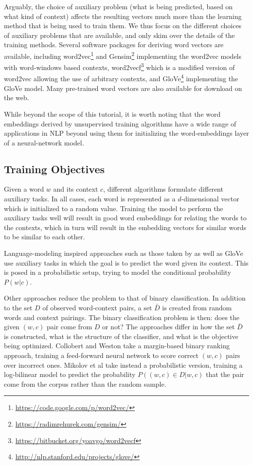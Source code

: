 \documentclass[jair,twoside,11pt,theapa]{article}
\renewcommand{\shortcite}[0]{\citeyear}
\begin{document}
{%
Arguably, the choice of auxiliary problem (what is being predicted, based
on what kind of context) affects the resulting vectors much more than the learning
method that is being used to train them.  We thus focus on the different
choices of auxiliary problems that are available, and only skim over the details
of the training methods.  Several software packages for deriving word vectors
are available, including word2vec\footnote{\url{https://code.google.com/p/word2vec/}} and Gensim\footnote{\url{https://radimrehurek.com/gensim/}}
implementing the word2vec models with word-windows based contexts,
word2vecf\footnote{\url{https://bitbucket.org/yoavgo/word2vecf}} which is a modified version of word2vec allowing
the use of arbitrary contexts, and GloVe\footnote{\url{http://nlp.stanford.edu/projects/glove/}} implementing the GloVe model.
Many pre-trained word vectors are also available for download on the web.

While beyond the scope of this tutorial, it is worth noting that the word
embeddings derived by unsupervised training algorithms have a wide range of
applications in NLP beyond using them for initializing the word-embeddings layer
of a neural-network model.

\subsection{Training Objectives}

Given a word $w$ and its context $c$, different algorithms formulate different
auxiliary tasks.  In all cases, each word is represented as a $d$-dimensional
vector which is initialized to a random value. Training the model to perform the
auxiliary tasks well will result in good word embeddings for relating the words
to the contexts, which in turn will result in the embedding vectors for similar
words to be similar to each other.

Language-modeling inspired approaches such as those taken by
\cite{mikolov2013distributed,mnih2013learning} as well as GloVe \cite{pennington2014glove}
use auxiliary tasks in which the goal
is to predict the word given its context. This is posed in a probabilistic
setup, trying to model the conditional probability $P(w|c)$. 

Other approaches reduce the problem to that of binary classification.
In addition to the set $D$ of observed word-context pairs, a set
$\bar{D}$ is created from random words and context pairings.
The binary classification problem is then: does the given $(w,c)$ pair come from
$D$ or not? The approaches differ in how the set $\bar{D}$ is constructed, what is the
structure of the classifier, and what is the objective being optimized.
Collobert and Weston \shortcite{collobert2008unified,collobert2011natural} take a margin-based binary ranking
approach, training a feed-forward neural network to score correct $(w,c)$ pairs
over incorrect ones.
Mikolov et al \shortcite{mikolov2013distributed,goldberg2014word2vec} take instead a probabilistic version, training a
log-bilinear model to predict the probability $P( (w,c) \in D|w,c)$ that the pair come from the
corpus rather than the random sample.

}
\end{document}
